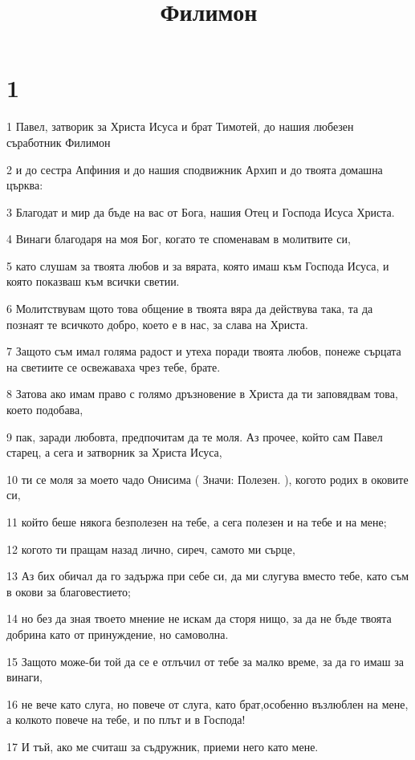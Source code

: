 

\title{Филимон}


\chapter{1}

\par 1 Павел, затворик за Христа Исуса и брат Тимотей, до нашия любезен съработник Филимон
\par 2 и до сестра Апфиния и до нашия сподвижник Архип и до твоята домашна църква:
\par 3 Благодат и мир да бъде на вас от Бога, нашия Отец и Господа Исуса Христа.
\par 4 Винаги благодаря на моя Бог, когато те споменавам в молитвите си,
\par 5 като слушам за твоята любов и за вярата, която имаш към Господа Исуса, и която показваш към всички светии.
\par 6 Молитствувам щото това общение в твоята вяра да действува така, та да познаят те всичкото добро, което е в нас, за слава на Христа.
\par 7 Защото съм имал голяма радост и утеха поради твоята любов, понеже сърцата на светиите се освежаваха чрез тебе, брате.
\par 8 Затова ако имам право с голямо дръзновение в Христа да ти заповядвам това, което подобава,
\par 9 пак, заради любовта, предпочитам да те моля. Аз прочее, който сам Павел старец, а сега и затворник за Христа Исуса,
\par 10 ти се моля за моето чадо Онисима ( Значи: Полезен. ), когото родих в оковите си,
\par 11 който беше някога безполезен на тебе, а сега полезен и на тебе и на мене;
\par 12 когото ти пращам назад лично, сиреч, самото ми сърце,
\par 13 Аз бих обичал да го задържа при себе си, да ми слугува вместо тебе, като съм в окови за благовестието;
\par 14 но без да зная твоето мнение не искам да сторя нищо, за да не бъде твоята добрина като от принуждение, но самоволна.
\par 15 Защото може-би той да се е отлъчил от тебе за малко време, за да го имаш за винаги,
\par 16 не вече като слуга, но повече от слуга, като брат,особенно възлюблен на мене, а колкото повече на тебе, и по плът и в Господа!
\par 17 И тъй, ако ме считаш за съдружник, приеми него като мене.
